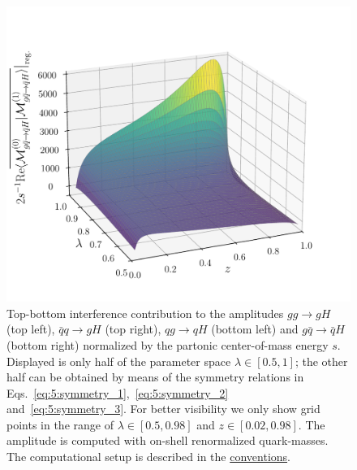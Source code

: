\begin{figure}[ht]
\begin{minipage}[t]{0.49\textwidth}
  \centering
  \includegraphics[width=\textwidth]{Images/RV_amplitudes/tOSbOS_gqB.pdf}
  \end{minipage}
  \caption{Top-bottom interference contribution to the amplitudes $gg \rightarrow gH$ (top left), $\bar{q}q \rightarrow g H$ (top right), $qg \rightarrow q H$ (bottom left) and $g \bar{q} \rightarrow \bar{q}H$ (bottom right) normalized by the partonic center-of-mass energy $s$. Displayed is only half of the parameter space $\lambda \in [0.5, 1]$; the other half can be obtained by means of the symmetry relations in Eqs.~\eqref{eq:5:symmetry_1},\ \eqref{eq:5:symmetry_2} and\ \eqref{eq:5:symmetry_3}. For better visibility we only show grid points in the range of $\lambda \in [0.5, 0.98]$ and $z \in [0.02, 0.98]$. The amplitude is computed with on-shell renormalized quark-masses. The computational setup is described in the \hyperref[chap:notation_and_conventions]{conventions}.}
  \label{fig:5:RV_tOSbOS}
\end{figure}
%
